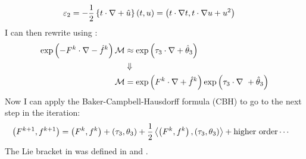 \documentclass[english,12pt,article]{article} %
\begin{document}
{{{%
\begin{align} {\varepsilon }_{2}&=-{1 \over 2}\left\{{t\cdot \nabla +\hat{u}}\right\}\left({t,u}\right)=
\left({t\cdot \nabla t,t\cdot \nabla u+{u}^{2}}\right)\  \label{eq:e2}\end{align}
%
I can then rewrite  using :
%
\begin{align} \exp\left({-{F}^{k}\cdot \nabla -{\hat{f}}^{k}}\right){\cal M}&\approx \exp\left({{\tau }_{3}\cdot \nabla +{\hat{\theta }}_{3}}\right)\nonumber \\
 &\Downarrow \nonumber \\
 {\cal M}&=\exp\left({{F}^{k}\cdot \nabla +{\hat{f}}^{k}}\right)\exp\left({{\tau }_{3}\cdot \nabla \ +{\hat{\theta }}_{3}}\right)\label{kintr} \end{align}
%
%
Now I can apply the Baker-Campbell-Hausdorff formula (CBH) to go to the next step in the iteration:
%
\begin{align} \left({{F}^{k+1},{f}^{k+1}}\right)&=\left({{F}^{k},{f}^{k}}\right)+\left({{\tau }_{3},{\theta }_{3}}\right)+{1 \over 2}\left\langle{\left({{F}^{k},{f}^{k}}\right),\left({{\tau }_{3},{\theta }_{3}}\right)}\right\rangle+{\rm h}{\rm i}{\rm g}{\rm h}{\rm e}{\rm r}~{\rm o}{\rm r}{\rm d} {\rm e}{\rm r}\cdots \label{cbhft}\end{align}
The Lie bracket in  was defined in   and .

}}}
\end{document}

